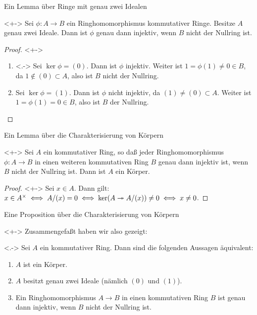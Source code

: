 \begin{frame}{Ein Lemma über Ringe mit genau zwei Idealen}
    \begin{lemma}<+->
        Sei \(\phi\colon A \to B\) ein Ringhomomorphismus kommutativer Ringe.
        Besitze \(A\) genau zwei
        Ideale. Dann ist \(\phi\) genau dann injektiv, wenn \(B\) nicht der Nullring
        ist.
    \end{lemma}
    \begin{proof}<+->
        \begin{enumerate}[<+->]
        \item<.->
            Sei \(\ker \phi = (0)\). Dann ist \(\phi\) injektiv. Weiter ist
            \(1 = \phi(1) \neq 0 \in B\), da \(1 \notin (0) \subset A\), also ist
            \(B\) nicht der Nullring.
        \item
            Sei \(\ker \phi = (1)\). Dann ist \(\phi\) nicht injektiv, da
            \((1) \neq (0) \subset A\). Weiter ist \(1 = \phi(1) = 0 \in B\), also ist
            \(B\) der Nullring.
            \qedhere
        \end{enumerate}
    \end{proof}
\end{frame}

\begin{frame}{Ein Lemma über die Charakterisierung von Körpern}
    \begin{lemma}<+->
        Sei \(A\) ein kommutativer Ring, so daß jeder Ringhomomorphismus \(\phi\colon A \to B\)
        in einen weiteren kommutativen Ring \(B\) genau dann injektiv ist, wenn \(B\) nicht der
        Nullring ist. Dann ist \(A\) ein Körper.
    \end{lemma}
    \begin{proof}<+->
        Sei \(x \in A\). Dann gilt:
        \(x \in A^\times \iff A/(x) = 0 \iff \ker(A \twoheadrightarrow A/(x)) \neq 0
        \iff x \neq 0\).
    \end{proof}
\end{frame}

\begin{frame}{Eine Proposition über die Charakterisierung von Körpern}
    \begin{visibleenv}<+->
        Zusammengefaßt haben wir also gezeigt:
    \end{visibleenv}
    \begin{proposition}<.->
        Sei \(A\) ein kommutativer Ring. Dann sind die folgenden Aussagen äquivalent:
        \begin{enumerate}
        \item
            \(A\) ist ein Körper.
        \item
            \(A\) besitzt genau zwei Ideale (nämlich \((0)\) und \((1)\)).
        \item
            Ein Ringhomomorphismus \(A \to B\) in einen kommutativen Ring \(B\) ist genau dann
            injektiv, wenn \(B\) nicht der Nullring ist.
            \qedhere
        \end{enumerate}
    \end{proposition}
\end{frame}

